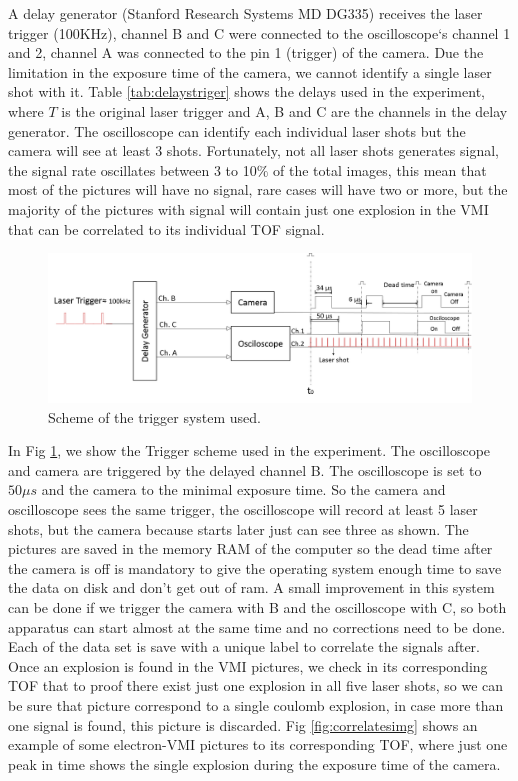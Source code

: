 A delay generator (Stanford Research Systems MD DG335) receives the laser trigger (100KHz), channel B and C were connected to the oscilloscope`s channel 1 and 2, channel A was connected to the pin 1 (trigger) of the camera. Due the limitation in the exposure time of the camera, we cannot identify a single laser shot with it. Table \ref{tab:delaystriger} shows the delays used in the experiment, where $T$ is the original laser trigger and A, B and C are the channels in the delay generator. The oscilloscope can identify each individual laser shots but the camera will see at least 3 shots. Fortunately, not all laser shots generates signal, the signal rate oscillates between 3 to 10$\%$ of the total images, this mean that most of the pictures will have no signal, rare cases will have two or more, but the majority of the pictures with signal will contain just one explosion in the VMI that can be correlated to its individual TOF signal. 

\begin{figure}[h!]

\centering
\includegraphics[width = 14 cm]{../Images/Trigger scheme.png}
\caption[Trigger Scheme]{Scheme of the trigger system used.  }
\label{fig:triggers}
\end{figure}

In Fig \ref{fig:triggers}, we show the Trigger scheme used in the experiment. The oscilloscope and camera are triggered by the delayed channel B. The oscilloscope is set to $50\mu s$ and the camera to the minimal exposure time. So the camera and oscilloscope sees the same trigger, the oscilloscope will record at least 5 laser shots, but the camera because starts later just can see three as shown. The pictures are saved in the memory RAM of the computer so the dead time after the camera is off is mandatory to give the operating system enough time to save the data on disk and don't get out of ram. A small improvement in this system can be done if we trigger the camera with B and the oscilloscope with C, so both apparatus can start almost at the same time and no corrections need to be done. Each of the data set is save with a unique label to correlate the signals after. Once an explosion is found in the VMI pictures, we check in its corresponding TOF that to proof there exist just one explosion in all five laser shots, so we can be sure that picture correspond to a single coulomb explosion, in case more than one signal is found, this picture is discarded. Fig \ref{fig:correlatesimg} shows an example of some electron-VMI pictures to its corresponding TOF, where just one peak in time shows the single explosion during the exposure time of the camera.

